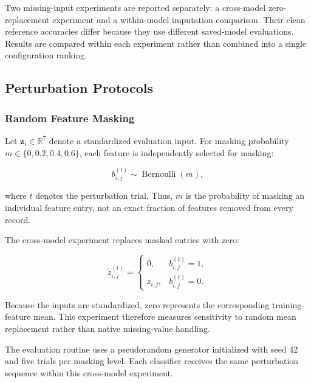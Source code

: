 Two missing-input experiments are reported separately: a
cross-model zero-replacement experiment and a within-model imputation
comparison. Their clean reference accuracies differ because they use
different saved-model evaluations. Results are compared within each
experiment rather than combined into a single configuration ranking.

\subsection{Perturbation Protocols}

\subsubsection{Random Feature Masking}

Let $\mathbf{z}_i\in\mathbb{R}^{7}$ denote a standardized
evaluation input. For masking probability
$m\in\{0,0.2,0.4,0.6\}$, each feature is independently selected
for masking:

\begin{equation}
b_{i,j}^{(t)}
\sim
\operatorname{Bernoulli}(m),
\label{eq:robustness_mask}
\end{equation}

where $t$ denotes the perturbation trial. Thus, $m$ is the
probability of masking an individual feature entry, not an exact
fraction of features removed from every record.

The cross-model experiment replaces masked entries with zero:

\begin{equation}
\widetilde{z}_{i,j}^{(t)}
=
\begin{cases}
0, & b_{i,j}^{(t)}=1,\\
z_{i,j}, & b_{i,j}^{(t)}=0.
\end{cases}
\label{eq:robustness_zero_fill}
\end{equation}

Because the inputs are standardized, zero represents the corresponding
training-feature mean. This experiment therefore measures sensitivity
to random mean replacement rather than native missing-value handling.

The evaluation routine uses a pseudorandom generator initialized with
seed 42 and five trials per masking level. Each classifier receives
the same perturbation sequence within this cross-model experiment.

